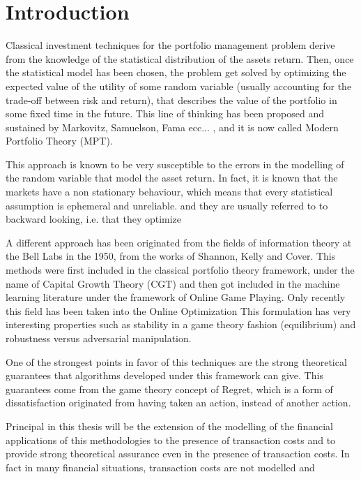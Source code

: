 \chapter{Introduction}

Classical investment techniques for the portfolio management problem derive from the knowledge of the statistical distribution of the assets return. Then, once the statistical model has been chosen, the problem get solved by optimizing the expected value of the utility of some random variable (usually accounting for the trade-off between risk and return), that describes the value of the portfolio in some fixed time in the future. This line of thinking has been proposed and sustained by Markovitz, Samuelson, Fama ecc... %
, and it is now called Modern Portfolio Theory (MPT).

This approach is known to be very susceptible to the errors in the modelling of the random variable that model the asset return. In fact, it is known that the markets have a non stationary behaviour, which means that every statistical assumption is ephemeral and unreliable. %
and they are usually referred to to backward looking, i.e. that they optimize 

A different approach has been originated from the fields of information theory at the Bell Labs in the 1950, from the works of Shannon, Kelly and Cover. This methods were first included in the classical portfolio theory framework, under the name of Capital Growth Theory (CGT) \cite{hakansson1995capital} and then got included in the machine learning literature under the framework of Online Game Playing. Only recently this field has been taken into the Online Optimization This formulation has very interesting properties such as stability in a game theory fashion (equilibrium) and robustness versus adversarial manipulation.

One of the strongest points in favor of this techniques are the strong theoretical guarantees that algorithms developed under this framework can give. This guarantees come from the game theory concept of Regret, which is a form of dissatisfaction originated from having taken an action, instead of another action.

Principal in this thesis will be the extension of the modelling of the financial applications of this methodologies to the presence of transaction costs and to provide strong theoretical assurance even in the presence of transaction costs. In fact in many financial situations, transaction costs are not modelled and 
